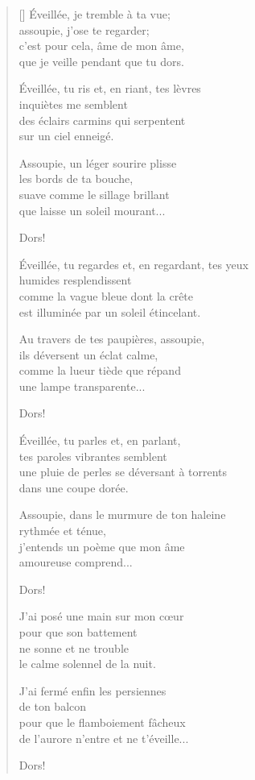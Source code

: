 \documentclass[a4paper,12pt]{book}
\begin{document}
\begin{verse}[\versewidth]
  Éveillée, je tremble à ta vue; \\
  assoupie, j'ose te regarder; \\
  c'est pour cela, âme de mon âme, \\
  que je veille pendant que tu dors.

  Éveillée, tu ris et, en riant, tes lèvres \\
  inquiètes me semblent \\
  des éclairs carmins qui serpentent \\
  sur un ciel enneigé.

  Assoupie, un léger sourire plisse \\
  les bords de ta bouche, \\
  suave comme le sillage brillant \\
  que laisse un soleil mourant...

  Dors!

  Éveillée, tu regardes et, en regardant, tes yeux \\
  humides resplendissent \\
  comme la vague bleue dont la crête \\
  est illuminée par un soleil étincelant.

  Au travers de tes paupières, assoupie, \\
  ils déversent un éclat calme, \\
  comme la lueur tiède que répand \\
  une lampe transparente...

  Dors!

  Éveillée, tu parles et, en parlant, \\
  tes paroles vibrantes semblent \\
  une pluie de perles se déversant à torrents \\
  dans une coupe dorée.

  Assoupie, dans le murmure de ton haleine \\
  rythmée et ténue, \\
  j'entends un poème que mon âme \\
  amoureuse comprend...

  Dors!

  J'ai posé une main sur mon cœur \\
  pour que son battement \\
  ne sonne et ne trouble \\
  le calme solennel de la nuit.

  J'ai fermé enfin les persiennes \\
  de ton balcon \\
  pour que le flamboiement fâcheux \\
  de l'aurore n'entre et ne t'éveille...

  Dors!
\end{verse}
\end{document}
